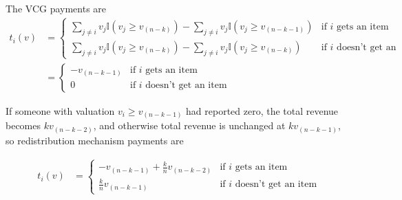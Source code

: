 \documentclass[letter, 10pt]{article}
\theoremstyle{definition}
\begin{document}
\begin{spacing}{1.1}
\begin{enumerate}
  The VCG payments are
  \begin{align*}
    t_i(v) &= 
      \begin{cases}
        \sum_{j \ne i} v_j \mathbb{I}(v_j \ge v_{(n-k)}) - \sum_{j \ne i}
        v_j \mathbb{I}(v_j \ge v_{(n-k-1)}) & \mbox{if $i$ gets an item} \\
        \sum_{j \ne i} v_j \mathbb{I}(v_j \ge v_{(n-k)}) - \sum_{j \ne i}
        v_j \mathbb{I}(v_j \ge v_{(n-k)}) & \mbox{if $i$ doesn't get
          an item} 
      \end{cases} \\
      & =
      \begin{cases}
        -v_{(n-k-1)} & \mbox{if $i$ gets an item} \\
        0 & \mbox{if $i$ doesn't get an item}
      \end{cases}
  \end{align*}

  If someone with valuation $v_i \ge v_{(n-k-1)}$ had reported zero, the
  total revenue becomes $k v_{(n-k-2)}$, and otherwise total revenue is
  unchanged at $k v_{(n-k-1)}$, so redistribution mechanism payments are

  \begin{align*}
    t_i(v) &= 
      \begin{cases}
        - v_{(n-k-1)} + \frac{k}{n} v_{(n-k-2)} & \mbox{if $i$ gets an item} \\
        \frac{k}{n} v_{(n-k-1)} & \mbox{if $i$ doesn't get an item}
      \end{cases}
  \end{align*}

\end{enumerate}

\end{spacing}
\end{document}
